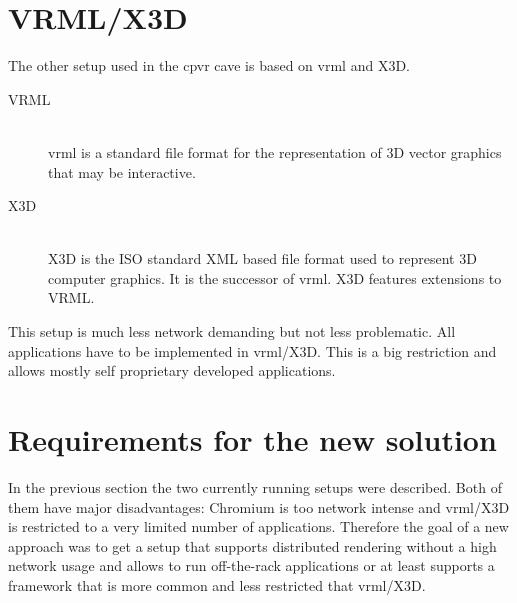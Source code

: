 \section{VRML/X3D}
The other setup used in the \gls{cpvr} \gls{cave} is based on \gls{vrml} and X3D. 
\begin{description}
	\item[VRML\cite{website:VRML}] \hfill\\\gls{vrml} is a standard file format for the representation of 3D vector graphics that may be interactive.
	\item[X3D\cite{website:X3D}] \hfill\\X3D is the ISO standard XML based file format used to represent 3D computer graphics. It is the successor of \gls{vrml}. X3D features extensions to VRML.
\end{description}

This setup is much less network demanding but not less problematic. All applications have to be implemented in \gls{vrml}/X3D. This is a big restriction and allows mostly self proprietary developed applications.

\section{Requirements for the new solution}
In the previous section the two currently running setups were described. Both of them have major disadvantages: Chromium is too network intense and \gls{vrml}/X3D is restricted to a very limited number of applications. Therefore the goal of a new approach was to get a setup that supports distributed rendering without a high network usage and allows to run off-the-rack applications or at least supports a framework that is more common and less restricted that \gls{vrml}/X3D. 
